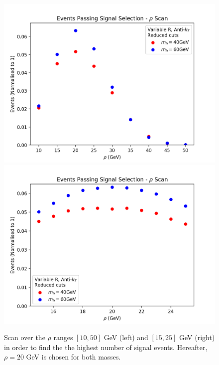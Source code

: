 \documentclass[12pt]{article}
\begin{document}
\begin{figure}[htb!]
	\includegraphics[scale=0.45]{plots/rho_scan_results_1050.png}
	\includegraphics[scale=0.45]{plots/rho_scan_results_1525.png}
	\caption{Scan over the $\rho$ ranges $[10,50]$ GeV (left) and $[15,25]$ GeV (right) in order to find the  the highest number of signal events. Hereafter, $\rho=20$ GeV is chosen for both masses.}
\label{fig:rhoscan}
\end{figure}
\end{document}
